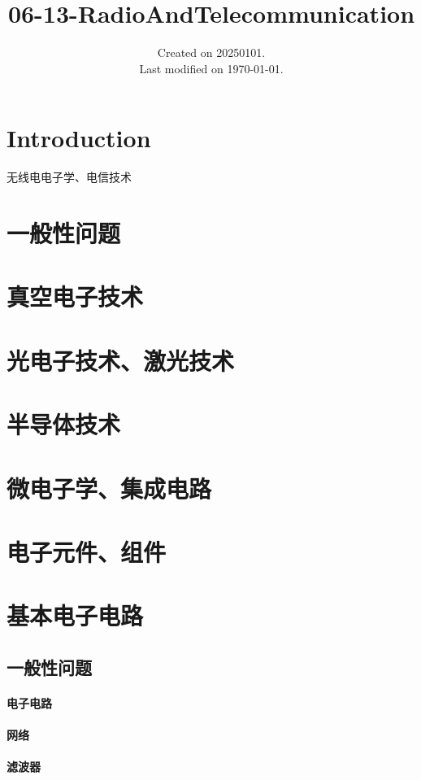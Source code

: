 \documentclass[UTF8]{../../ApplicationUniverse}
\begin{document}
\title{06-13-RadioAndTelecommunication}
\date{Created on 20250101.\\   Last modified on \today.}
\maketitle
\tableofcontents


\chapter{Introduction}


无线电电子学、电信技术


\chapter{一般性问题}
\chapter{真空电子技术}
\chapter{光电子技术、激光技术}
\chapter{半导体技术}
\chapter{微电子学、集成电路}
\chapter{电子元件、组件}
\chapter{基本电子电路}
\section{一般性问题}
    \subsubsection{电子电路}
    \subsubsection{网络}
    \subsubsection{滤波器}
\end{document}
